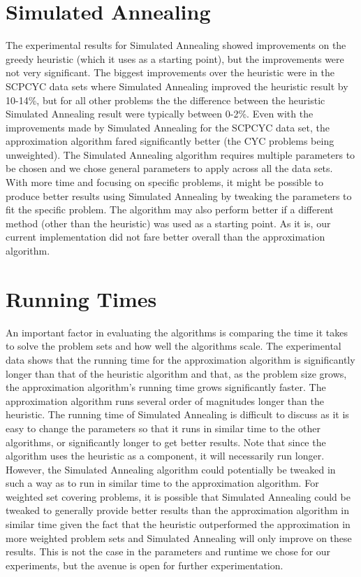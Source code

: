 \section{Simulated Annealing}
The experimental results for Simulated Annealing showed improvements on the greedy heuristic (which it uses as a starting point), but the improvements were not very significant. The biggest improvements over the heuristic were in the SCPCYC data sets where Simulated Annealing improved the heuristic result by 10-14\%, but for all other problems the the difference between the heuristic Simulated Annealing result were typically between 0-2\%. Even with the improvements made by Simulated Annealing for the SCPCYC data set, the approximation algorithm fared significantly better (the CYC problems being unweighted). The Simulated Annealing algorithm requires multiple parameters to be chosen and we chose general parameters to apply across all the data sets. With more time and focusing on specific problems, it might be possible to produce better results using Simulated Annealing by tweaking the parameters to fit the specific problem. The algorithm may also perform better if a different method (other than the heuristic) was used as a starting point. As it is, our current implementation did not fare better overall than the approximation algorithm.

\section{Running Times}
An important factor in evaluating the algorithms is comparing the time it takes to solve the problem sets and how well the algorithms scale. The experimental data shows that the running time for the approximation algorithm is significantly longer than that of the heuristic algorithm and that, as the problem size grows, the approximation algorithm's running time grows significantly faster. The approximation algorithm runs several order of magnitudes longer than the heuristic.
The running time of Simulated Annealing is difficult to discuss as it is easy to change the parameters so that it runs in similar time to the other algorithms, or significantly longer to get better results. Note that since the algorithm uses the heuristic as a component, it will necessarily run longer. However, the Simulated Annealing algorithm could potentially be tweaked in such a way as to run in similar time to the approximation algorithm. For weighted set covering problems, it is possible that Simulated Annealing could be tweaked to generally provide better results than the approximation algorithm in similar time given the fact that the heuristic outperformed the approximation in more weighted problem sets and Simulated Annealing will only improve on these results. This is not the case in the parameters and runtime we chose for our experiments, but the avenue is open for further experimentation.

